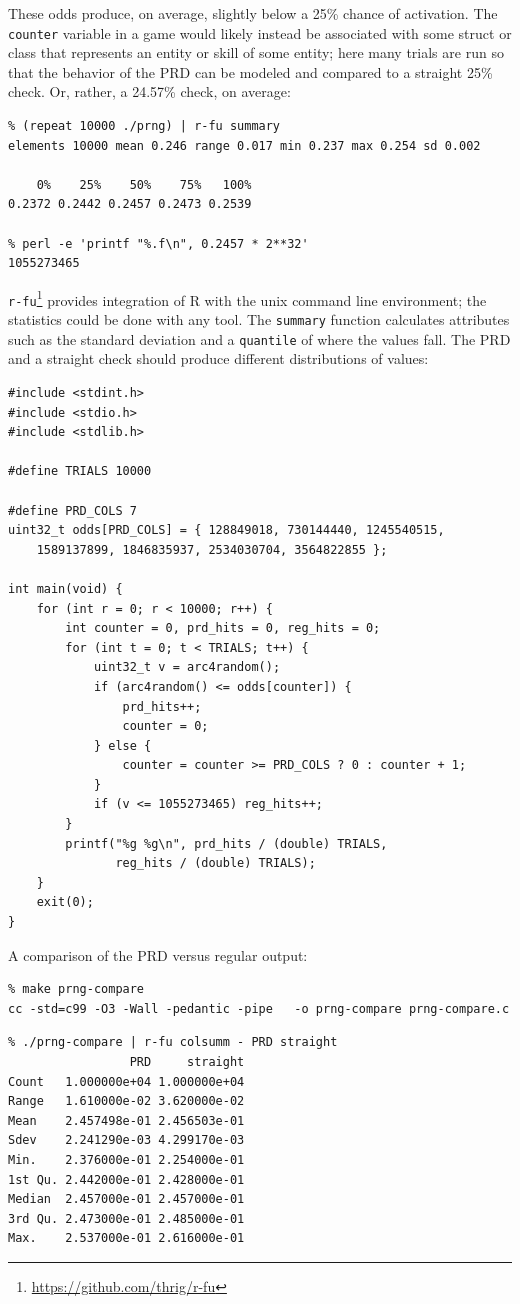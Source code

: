 \documentclass[12pt,a4paper]{article}
\begin{document}
These odds produce, on average, slightly below a 25\% chance of
activation. The \texttt{counter} variable in a game would likely instead
be associated with some struct or class that represents an entity or
skill of some entity; here many trials are run so that the behavior of
the PRD can be modeled and compared to a straight 25\% check. Or,
rather, a 24.57\% check, on average:

\clearpage
\begin{verbatim}
% (repeat 10000 ./prng) | r-fu summary
elements 10000 mean 0.246 range 0.017 min 0.237 max 0.254 sd 0.002

    0%    25%    50%    75%   100% 
0.2372 0.2442 0.2457 0.2473 0.2539 

% perl -e 'printf "%.f\n", 0.2457 * 2**32'
1055273465
\end{verbatim}

\texttt{r-fu}\footnote{\url{https://github.com/thrig/r-fu}} provides
integration of R with the unix command line environment; the statistics
could be done with any tool. The \texttt{summary} function calculates
attributes such as the standard deviation and a \texttt{quantile} of
where the values fall. The PRD and a straight check should produce
different distributions of values:

\begin{verbatim}
#include <stdint.h>
#include <stdio.h>
#include <stdlib.h>

#define TRIALS 10000

#define PRD_COLS 7
uint32_t odds[PRD_COLS] = { 128849018, 730144440, 1245540515,
    1589137899, 1846835937, 2534030704, 3564822855 };

int main(void) {
    for (int r = 0; r < 10000; r++) {
        int counter = 0, prd_hits = 0, reg_hits = 0;
        for (int t = 0; t < TRIALS; t++) {
            uint32_t v = arc4random();
            if (arc4random() <= odds[counter]) {
                prd_hits++;
                counter = 0;
            } else {
                counter = counter >= PRD_COLS ? 0 : counter + 1;
            }
            if (v <= 1055273465) reg_hits++;
        }
        printf("%g %g\n", prd_hits / (double) TRIALS,
               reg_hits / (double) TRIALS);
    }
    exit(0);
}
\end{verbatim}

A comparison of the PRD versus regular output:

\begin{verbatim}
% make prng-compare
cc -std=c99 -O3 -Wall -pedantic -pipe   -o prng-compare prng-compare.c 
\end{verbatim}
\begin{verbatim}
% ./prng-compare | r-fu colsumm - PRD straight
                 PRD     straight
Count   1.000000e+04 1.000000e+04
Range   1.610000e-02 3.620000e-02
Mean    2.457498e-01 2.456503e-01
Sdev    2.241290e-03 4.299170e-03
Min.    2.376000e-01 2.254000e-01
1st Qu. 2.442000e-01 2.428000e-01
Median  2.457000e-01 2.457000e-01
3rd Qu. 2.473000e-01 2.485000e-01
Max.    2.537000e-01 2.616000e-01
\end{verbatim}
\end{document}

